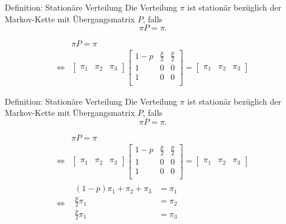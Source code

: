\documentclass[t,11pt]{beamer}
\begin{document}
\begin{frame}
\begin{alertblock}{Definition: Stationäre Verteilung}
	Die Verteilung $\pi$ ist stationär bezüglich der Markov-Kette mit Übergangsmatrix $P$, falls $$\pi P = \pi.$$
\end{alertblock}
\begin{align*}
&\pi P = \pi \\
\Longleftrightarrow & \begin{bmatrix}
\pi_1 & \pi_2 & \pi_3 
\end{bmatrix} \begin{bmatrix}
1-p & \frac{p}{2} & \frac{p}{2} \\
1 & 0 & 0 \\
1 & 0 & 0 \\
\end{bmatrix} = \begin{bmatrix}
\pi_1 & \pi_2 & \pi_3 
\end{bmatrix} 
\end{align*}
\end{frame}
\begin{frame}
\begin{alertblock}{Definition: Stationäre Verteilung}
	Die Verteilung $\pi$ ist stationär bezüglich der Markov-Kette mit Übergangsmatrix $P$, falls $$\pi P = \pi.$$
\end{alertblock}
\begin{align*}
&\pi P = \pi \\
\Longleftrightarrow & \begin{bmatrix}
\pi_1 & \pi_2 & \pi_3 
\end{bmatrix} \begin{bmatrix}
1-p & \frac{p}{2} & \frac{p}{2} \\
1 & 0 & 0 \\
1 & 0 & 0 \\
\end{bmatrix} = \begin{bmatrix}
\pi_1 & \pi_2 & \pi_3 
\end{bmatrix} \\
\Longleftrightarrow
&\begin{matrix}
(1-p) \pi_1 + \pi_2 + \pi_3 &= \pi_1 \\
\frac{p}{2}\pi_1 &= \pi_2 \\
\frac{p}{2}\pi_1 &= \pi_3 \\
\end{matrix}
\end{align*}
\end{frame}
\end{document}
